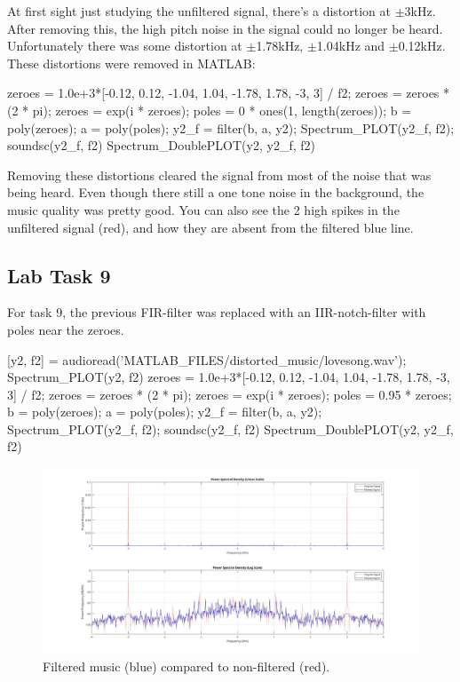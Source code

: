 \documentclass[a4paper,11pt]{article}
\begin{document}
At first sight just studying the unfiltered signal, there's a distortion at $\pm$3kHz. After removing this, the high pitch noise in the signal could no longer be heard. Unfortunately there was some distortion at $\pm$1.78kHz, $\pm$1.04kHz and $\pm$0.12kHz. These distortions were removed in MATLAB:
\begin{ffcode}
zeroes = 1.0e+3*[-0.12, 0.12, -1.04, 1.04, -1.78, 1.78, -3, 3] / f2;
zeroes = zeroes * (2 *  pi);
zeroes = exp(i * zeroes);
poles = 0 * ones(1, length(zeroes));
b = poly(zeroes);
a = poly(poles);
y2_f = filter(b, a, y2);
Spectrum_PLOT(y2_f, f2);
soundsc(y2_f, f2)
Spectrum_DoublePLOT(y2, y2_f, f2)
\end{ffcode}
Removing these distortions  cleared the signal from most of the noise that was being heard. Even though there still a one tone noise in the background, the music quality was pretty good. You can also see the 2 high spikes in the unfiltered signal (red), and how they are absent from the filtered blue line. 

\subsection{Lab Task 9}
For task 9, the previous FIR-filter was replaced with an IIR-notch-filter with poles near the zeroes.
\begin{ffcode}
[y2, f2] = audioread('MATLAB_FILES/distorted_music/lovesong.wav');
Spectrum_PLOT(y2, f2)
zeroes = 1.0e+3*[-0.12, 0.12, -1.04, 1.04, -1.78, 1.78, -3, 3] / f2;
zeroes = zeroes * (2 * pi);
zeroes = exp(i * zeroes);
poles = 0.95 * zeroes;
b = poly(zeroes);
a = poly(poles);
y2_f = filter(b, a, y2);
Spectrum_PLOT(y2_f, f2);
soundsc(y2_f, f2)
Spectrum_DoublePLOT(y2, y2_f, f2)
\end{ffcode}
\begin{figure}[H]
    \hspace{-40pt}\includegraphics[scale=0.28]{./images/Task9-double-plot.jpg}
    \caption{Filtered music (blue) compared to non-filtered (red).}
    \label{fig:my_label}
\end{figure}
\end{document}
